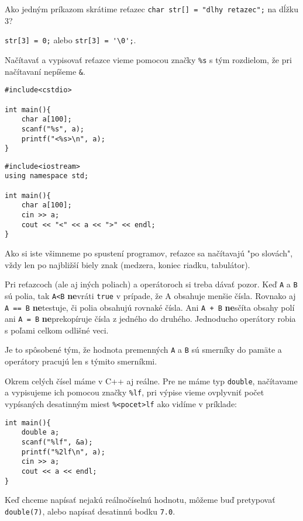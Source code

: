\cvicenie Ako jedným príkazom skrátime reťazec 
\verb!char str[] = "dlhy retazec";! na dĺžku 3?

\riesenie \verb!str[3] = 0;! alebo \verb!str[3] = '\0';!.

\medskip

Načítavať a vypisovať reťazce vieme pomocou značky \verb!%s! s tým rozdielom,
že pri načítavaní nepíšeme \verb!&!.

\begin{lstlisting}
#include<cstdio>

int main(){
    char a[100];
    scanf("%s", a);
    printf("<%s>\n", a);
}
\end{lstlisting}
\begin{lstlisting}
#include<iostream>
using namespace std;

int main(){
    char a[100];
    cin >> a;
    cout << "<" << a << ">" << endl;
}
\end{lstlisting}

Ako si iste všimneme po spustení programov, reťazce sa načítavajú "po slovách",
vždy len po najbližší biely znak (medzera, koniec riadku, tabulátor).

\medskip

Pri reťazcoch (ale aj iných poliach) a operátoroch si treba dávať pozor.  Keď
\verb!A! a \verb!B! sú polia, tak \verb!A<B! \textbf{ne}vráti \verb!true! v
prípade, že A obsahuje menšie čísla. Rovnako aj \verb!A == B! \textbf{ne}testuje,
či polia obsahujú rovnaké čísla. Ani \verb!A + B! \textbf{ne}sčíta obsahy polí
ani \verb!A = B!  \textbf{ne}prekopíruje čísla z jedného do druhého. Jednoducho
operátory robia s poľami celkom odlišné veci.

Je to spôsobené tým, že hodnota premenných \verb!A! a \verb!B! sú smerníky do
pamäte a operátory pracujú len s týmito smerníkmi.


Okrem celých čísel máme v C++ aj reálne. Pre ne máme typ
\verb!double!, načítavame a vypisujeme ich pomocou značky \verb"%lf",
pri výpise vieme ovplyvniť počet vypísaných desatinným miest \verb"%<pocet>lf"
ako vidíme v príklade:

\begin{lstlisting}
int main(){
    double a;
    scanf("%lf", &a);
    printf("%2lf\n", a);
    cin >> a;
    cout << a << endl;
}
\end{lstlisting}

Keď chceme napísať nejakú reálnočíselnú hodnotu, môžeme buď pretypovať
\verb!double(7)!, alebo napísať desatinnú bodku \verb!7.0!.

